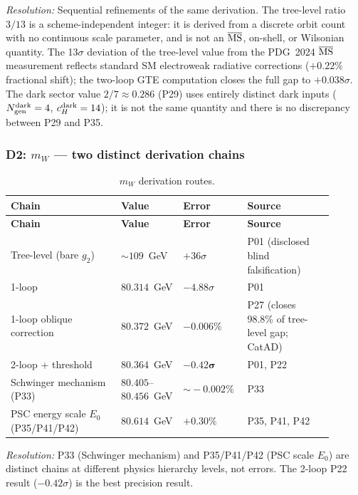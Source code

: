 \noindent\textit{Resolution:} Sequential refinements of the same derivation.
The tree-level ratio $3/13$ is a scheme-independent integer: it is derived from a
discrete orbit count with no continuous scale parameter, and is not an $\overline{\rm MS}$,
on-shell, or Wilsonian quantity.
The 13$\sigma$ deviation of the tree-level value from the PDG~2024 $\overline{\rm MS}$
measurement reflects standard SM electroweak radiative corrections ($+0.22\%$ fractional
shift); the two-loop GTE computation closes the full gap to $+0.038\sigma$.
The dark sector value $2/7 \approx 0.286$ (P29) uses entirely distinct dark inputs
($N_{\rm gen}^{\rm dark}=4$, $c_H^{\rm dark}=14$); it is not the same quantity and
there is no discrepancy between P29 and P35.

\subsubsection*{D2: $m_W$ — two distinct derivation chains}

\begingroup\footnotesize\renewcommand{\arraystretch}{1.2}
\begin{longtable}{@{}P{0.32\linewidth}P{0.18\linewidth}P{0.15\linewidth}P{0.25\linewidth}@{}}
\caption{$m_W$ derivation routes.}\label{tab:disc-mw}\\
\toprule
\textbf{Chain} & \textbf{Value} & \textbf{Error} & \textbf{Source} \\
\midrule \endfirsthead \midrule
\textbf{Chain} & \textbf{Value} & \textbf{Error} & \textbf{Source} \\
\midrule \endhead \bottomrule \endfoot
Tree-level (bare $g_2$) & $\sim\!109$~GeV & $+36\sigma$ & P01 (disclosed blind falsification) \\
1-loop & $80.314$~GeV & $-4.88\sigma$ & P01 \\
1-loop oblique correction & $\mathbf{80.372}$~GeV & $\mathbf{-0.006\%}$ & P27 (closes 98.8\% of tree-level gap; CatAD) \\
2-loop + threshold & $\mathbf{80.364}$~GeV & $\mathbf{-0.42\sigma}$ & P01, P22 \\
Schwinger mechanism (P33) & $80.405$--$80.456$~GeV & $\sim\!-0.002\%$ & P33 \\
PSC energy scale $E_0$ (P35/P41/P42) & $80.614$~GeV & $+0.30\%$ & P35, P41, P42 \\
\end{longtable}
\endgroup

\noindent\textit{Resolution:} P33 (Schwinger mechanism) and P35/P41/P42 (PSC scale $E_0$)
are distinct chains at different physics hierarchy levels, not errors.
The 2-loop P22 result ($-0.42\sigma$) is the best precision result.

